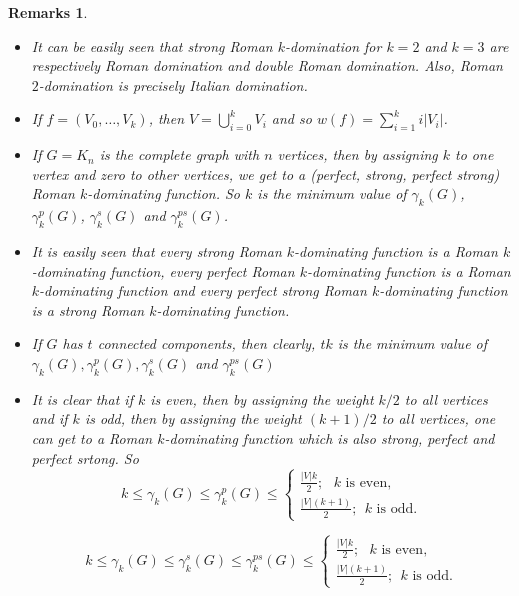 \documentclass[12pt]{amsart}
\newtheorem{remarks}[theorem]{Remarks}
\begin{document}
\begin{remarks}\label{2.2}
\begin{itemize}
\item[1)] It can be easily seen that strong Roman $k$-domination for $k=2$ and $k=3$ are respectively Roman domination and double Roman domination. Also, Roman $2$-domination is precisely Italian domination. 

\item[2)] If $f=(V_0, \dots, V_k)$, then $V=\bigcup_{i=0}^kV_i$ and so $w(f)=\sum_{i=1}^k i|V_i|$.

\item[3)] If $G=K_n$ is the complete graph with $n$ vertices, then by assigning $k$ to one vertex and zero to other vertices, we get to a (perfect, strong, perfect strong) Roman $k$-dominating function. So $k$ is the minimum value of $\gamma_k(G)$, $\gamma_k^p(G)$, $\gamma^s_k(G)$ and $\gamma_k^{ps}(G)$.

\item[4)] It is easily seen that every strong Roman $k$-dominating function is a Roman $k$-dominating function, every perfect Roman $k$-dominating function is a Roman $k$-dominating function and every perfect strong Roman $k$-dominating function is a strong Roman $k$-dominating function. 

\item[5)] If $G$ has $t$ connected components, then clearly, $tk$ is the minimum value of $\gamma_k(G), \gamma_k^p(G), \gamma_k^s(G)$ and $\gamma_k^{ps}(G)$

\item[6)]  It is clear that if $k$ is even, then by assigning the weight $k/2$ to all vertices and if $k$ is odd, then by assigning the weight $(k+1)/2$ to all vertices, one can get to a Roman $k$-dominating function which is also strong, perfect and perfect srtong. So
$$k\leq \gamma_k(G)\leq \gamma_k^p(G)\leq  \left\lbrace\begin{array}{l}
\frac{|V|k}{2}; \ \ \ k \text{ is even}, \\ 
\frac{|V|(k+1)}{2}; \ \ k \text{ is odd}.
\end{array}\right. $$

$$k\leq \gamma_k(G)\leq  \gamma_k^s(G)\leq \gamma_k^{ps}(G) \leq  \left\lbrace\begin{array}{l}
\frac{|V|k}{2}; \ \ \ k \text{ is even}, \\ 
\frac{|V|(k+1)}{2}; \ \ k \text{ is odd}.
\end{array}\right. $$


\end{itemize}
\end{remarks}
\end{document}
